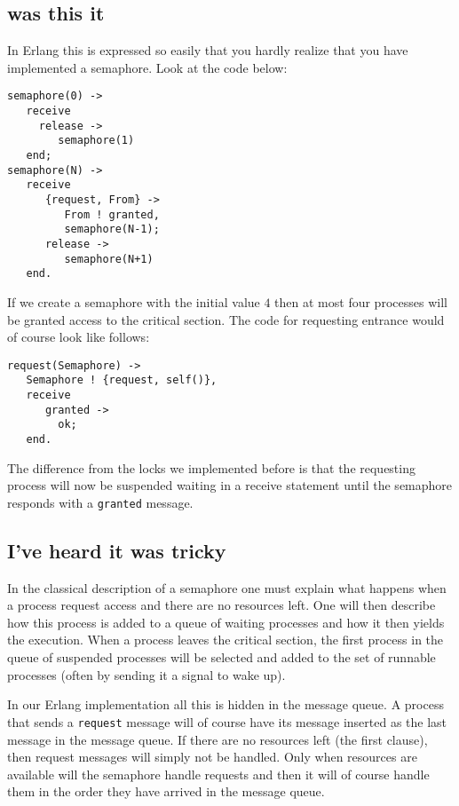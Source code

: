 \documentclass[a4paper,11pt]{article}
\begin{document}
\subsection{was this it}

In Erlang this is expressed so easily that you hardly realize that you
have implemented a semaphore. Look at the code below:

\begin{verbatim}
semaphore(0) ->
   receive 
     release ->
        semaphore(1)
   end;
semaphore(N) ->
   receive 
      {request, From} ->
         From ! granted,
         semaphore(N-1);
      release ->
         semaphore(N+1)
   end.
\end{verbatim}
      
If we create a semaphore with the initial value $4$
then at most four processes will be granted access to the critical
section. The code for requesting entrance would of course look like follows:

\begin{verbatim}
request(Semaphore) ->
   Semaphore ! {request, self()},
   receive 
      granted -> 
        ok;
   end.
\end{verbatim}

The difference from the locks we implemented before is that the
requesting process will now be suspended waiting in a receive
statement until the semaphore responds with a {\tt granted} message. 

\subsection{I've heard it was tricky}

In the classical description of a semaphore one must explain what
happens when a process request access and there are no resources
left. One will then describe how this process is added to a queue of
waiting processes and how it then yields the execution. When a process
leaves the critical section, the first process in the queue of
suspended processes will be selected and added to the set of runnable
processes (often by sending it a signal to wake up).

In our Erlang implementation all this is hidden in the message
queue. A process that sends a {\tt request} message will of course
have its message inserted as the last message in the message queue. If
there are no resources left (the first clause), then request messages
will simply not be handled. Only when resources are available will the
semaphore handle requests and then it will of course handle them in the
order they have arrived in the message queue.
\end{document}
